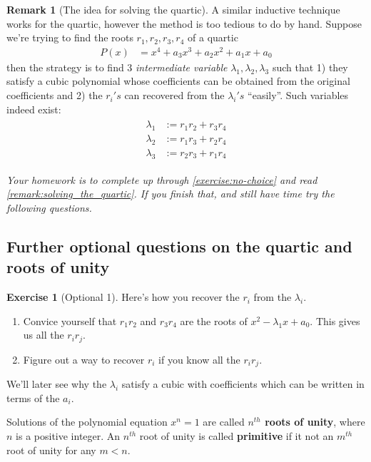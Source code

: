 \documentclass[reqno, 12pt, letter]{article}
\theoremstyle{plain}
\theoremstyle{definition}
\newtheorem{remark}[theorem]{Remark}
\newtheorem{exercise}[theorem]{Exercise}
\theoremstyle{remark}
\numberwithin{equation}{section}
\begin{document}
	\begin{remark}[The idea for solving the quartic]
		\label{remark:solving_the_quartic}
		A similar inductive technique works for the quartic, however the method is too tedious to do by hand. Suppose we're trying to find the roots $ r_1, r_2, r_3, r_4$ of a quartic \begin{align*}
			P(x) &= x^4 + a_3x^3 + a_2x^2 + a_1x + a_0
		\end{align*}
		then the strategy is to find 3 \emph{intermediate variable} $ \lambda_1, \lambda_2, \lambda_3$ such that 1) they satisfy a cubic polynomial whose coefficients can be obtained from the original coefficients and 2) the $r_i's$ can recovered from the $ \lambda_i's$ ``easily''. Such variables indeed exist:
			\begin{align}
				\label{equation:intermediate_variables_quartic}
				\begin{split}
					\lambda_1 &:= r_1 r_2 + r_3 r_4 \\
					\lambda_2 &:= r_1 r_3 + r_2 r_4 \\
					\lambda_3 &:= r_2 r_3 + r_1 r_4 
				\end{split}
			\end{align}
			
			{\it Your homework is to complete up through \autoref{exercise:no-choice} and read \autoref{remark:solving_the_quartic}. If you finish that, and still have time try the following questions.}
\subsection{Further optional questions on the quartic and roots of unity}			
		\begin{exercise}[Optional 1]
			Here's how you recover the $ r_i$ from the $ \lambda_i$.
			\begin{enumerate}
				\item Convice yourself that $ r_1 r_2$ and $r_3 r_4$ are the roots of $ x^2 - \lambda_1 x + a_0$. This gives us all the $ r_i r_j$.
				\item Figure out a way to recover $ r_i$ if you know all the $ r_i r_j$.
			\end{enumerate}
		\end{exercise}
		We'll later see why the $ \lambda_i$ satisfy a cubic with coefficients which can be written in terms of the $ a_i$.
	\end{remark}
	
		Solutions of the polynomial equation $ x^n = 1$ are called \textbf{$n^{th}$ roots of unity}, where $ n$ is a positive integer. An $ n^{th}$ root of unity is called \textbf{primitive} if it not an $ m^{th}$ root of unity for any $ m < n$.
	
\end{document}
